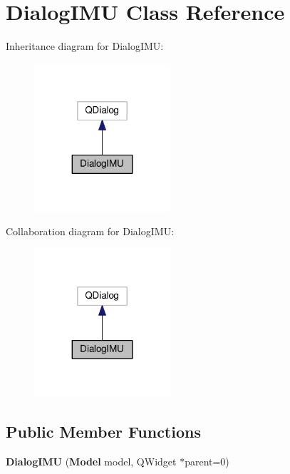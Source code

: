 \section{Dialog\+I\+MU Class Reference}
\label{class_dialog_i_m_u}


Inheritance diagram for Dialog\+I\+MU\+:\nopagebreak
\begin{figure}[H]
\begin{center}
\leavevmode
\includegraphics[width=143pt]{class_dialog_i_m_u__inherit__graph}
\end{center}
\end{figure}


Collaboration diagram for Dialog\+I\+MU\+:\nopagebreak
\begin{figure}[H]
\begin{center}
\leavevmode
\includegraphics[width=143pt]{class_dialog_i_m_u__coll__graph}
\end{center}
\end{figure}
\subsection*{Public Member Functions}
\begin{DoxyCompactItemize}
\item 
{\bfseries Dialog\+I\+MU} ({\bf Model} model, Q\+Widget $\ast$parent=0)\label{class_dialog_i_m_u_ad3c1aa164f7d62e550f613ef2a0f2783}

\end{DoxyCompactItemize}
